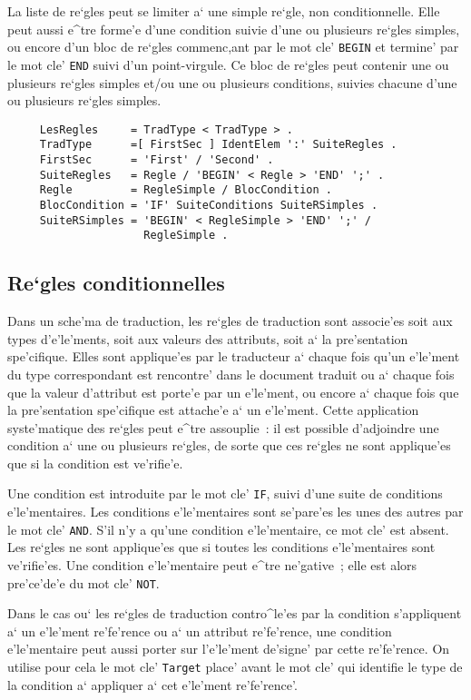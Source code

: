 {La liste de re`gles peut se limiter a` une simple re`gle, non
conditionnelle. Elle peut aussi e^tre forme'e d'une condition suivie d'une ou
plusieurs re`gles simples, ou encore d'un bloc de re`gles commenc,ant par le
mot cle' {\tt BEGIN} et termine' par le mot cle' {\tt END} suivi d'un
point-virgule. Ce bloc de re`gles peut contenir une ou plusieurs re`gles
simples et/ou une ou plusieurs conditions, suivies chacune d'une ou plusieurs
re`gles simples.

\begin{verbatim}
     LesRegles     = TradType < TradType > .
     TradType      =[ FirstSec ] IdentElem ':' SuiteRegles .
     FirstSec      = 'First' / 'Second' .
     SuiteRegles   = Regle / 'BEGIN' < Regle > 'END' ';' .
     Regle         = RegleSimple / BlocCondition .
     BlocCondition = 'IF' SuiteConditions SuiteRSimples .
     SuiteRSimples = 'BEGIN' < RegleSimple > 'END' ';' / 
                     RegleSimple .
\end{verbatim}

\subsection{Re`gles conditionnelles}
\label{tradcond}

Dans un sche'ma de traduction, les re`gles de traduction sont associe'es soit
aux types d'e'le'ments, soit aux valeurs des attributs,
soit a` la pre'sentation spe'cifique.
Elles sont applique'es
par le traducteur a` chaque fois qu'un e'le'ment du type correspondant est
rencontre' dans le document traduit ou a` chaque fois que la valeur
d'attribut est porte'e par un e'le'ment,
ou encore a` chaque fois que la pre'sentation spe'cifique est attache'e
a` un e'le'ment.
Cette
application syste'matique des re`gles peut e^tre assouplie~: il est
possible d'adjoindre une condition a` une ou plusieurs re`gles, de sorte que
ces re`gles ne sont applique'es que si la condition est ve'rifie'e.

Une condition est introduite par le mot cle' {\tt IF}, suivi
d'une suite de conditions e'le'mentaires. Les conditions e'le'mentaires sont
se'pare'es les unes des autres par le mot cle' {\tt AND}. S'il n'y a qu'une
condition e'le'mentaire, ce mot cle' est absent. Les re`gles ne sont
applique'es que si toutes les conditions e'le'mentaires sont ve'rifie'es.
Une condition e'le'mentaire peut e^tre ne'gative~; elle est alors pre'ce'de'e
du mot cle' {\tt NOT}.

Dans le cas ou` les re`gles de traduction contro^le'es par la condition
s'appliquent a` un e'le'ment re'fe'rence ou a` un attribut
re'fe'rence, une condition e'le'mentaire peut aussi porter sur l'e'le'ment
de'signe' par cette re'fe'rence. On utilise pour cela le mot cle' {\tt Target}
place' avant le mot cle' qui identifie le type de la condition a` appliquer
a` cet e'le'ment re'fe'rence'.

}
